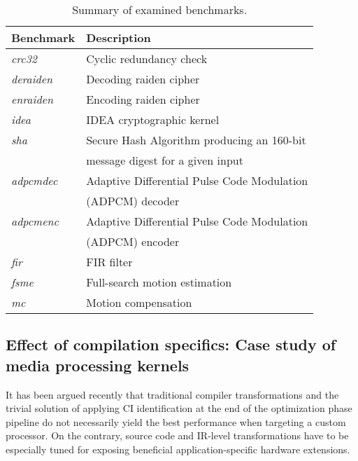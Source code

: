\documentclass{comjnl}
\begin{document}
\begin{table}
  \centering
  \renewcommand{\arraystretch}{0.925}
  \caption{Summary of examined benchmarks.} 
  {\footnotesize
  \begin{tabular}{|l|l|}
    \hline
    \multicolumn{1}{|m{2.0cm}|}{\centering Benchmark}
    &\multicolumn{1}{m{5.0cm}|}{\centering Description}\\
    \hline
    {\it crc32} & Cyclic redundancy check \\ \hline
    {\it deraiden} \cite{Raiden} & Decoding raiden cipher \\ \hline
    {\it enraiden} \cite{Raiden} & Encoding raiden cipher \\ \hline 
    {\it idea} & IDEA cryptographic kernel \\ \hline
    {\it sha} & Secure Hash Algorithm producing an 160-bit \\ 
    & message digest for a given input \\ \hline
    {\it adpcmdec} & Adaptive Differential Pulse Code Modulation \\ 
    & (ADPCM) decoder \\ \hline
    {\it adpcmenc} & Adaptive Differential Pulse Code Modulation \\ 
    & (ADPCM) encoder \\ \hline
    {\it fir} & FIR filter \\ \hline
    {\it fsme} & Full-search motion estimation \\ \hline
    {\it mc} & Motion compensation \\ \hline
  \end{tabular}
  }
  \label{Tab:2}
\end{table}

\subsection{Effect of compilation specifics: Case study of media processing kernels}
\label{Sec:CaseStudy}
It has been argued recently \cite{Bonzini06} that traditional compiler transformations and the trivial solution of applying CI identification at the end of the optimization phase pipeline do not necessarily yield the best performance when targeting a custom processor. On the contrary, source code and IR-level transformations have to be especially tuned for exposing beneficial application-specific hardware extensions. 
\end{document}
